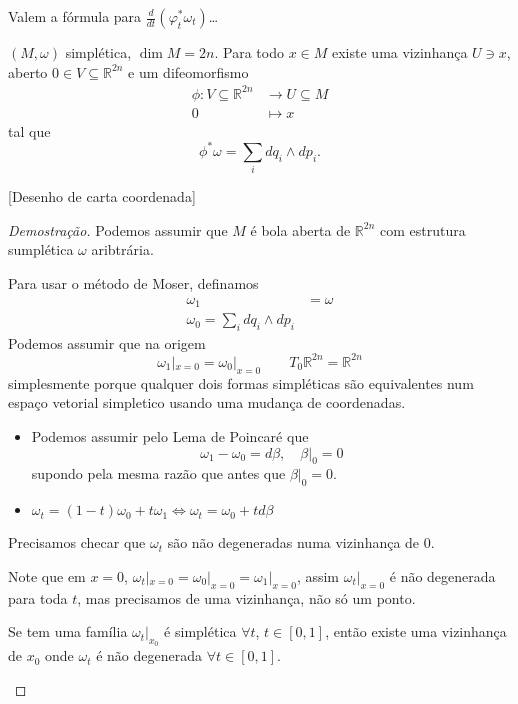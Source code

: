 Valem a f\'ormula para $\frac{d}{dt}(\varphi_t^*\omega_t)$…

\begin{thm}[Darboux]\leavevmode
	$(M,\omega)$ simpl\'etica, $\dim M=2n$. Para todo $x\in M$ existe uma vizinhança $U\ni x$, aberto  $0\in V\subseteq \mathbb{R}^{2n}$ e um difeomorfismo
	\begin{align*}
		\phi: V\subseteq \mathbb{R}^{2n} &\longrightarrow U\subseteq M \\
		0 &\longmapsto x
	\end{align*}
	tal que 
	\[\phi^* \omega=\sum_{i}dq_i\wedge dp_i.\]

	[Desenho de carta coordenada]
\end{thm}

\begin{proof}[Demostra\c c\~ao]
	Podemos assumir que $M$ \'e bola aberta de $\mathbb{R}^{2n}$ com estrutura sumpl\'etica $\omega$ aribtr\'aria.

	Para usar o m\'etodo de Moser, definamos
	\begin{align*}
		\omega_1& =\omega\\
		\omega_0=\sum_{i}dq_i\wedge dp_i
	\end{align*}
	Podemos assumir que na origem
	\[\omega_1|_{x=0}=\omega_0|_{x=0}\qquad T_0\mathbb{R}^{2n}=\mathbb{R}^{2n}\]
	simplesmente porque qualquer dois formas simpl\'eticas s\~ao equivalentes num espaço vetorial simpletico usando uma mudança de coordenadas.

\begin{itemize}
	\item	Podemos assumir pelo Lema de Poincar\'e que
	\[\omega_1-\omega_0=d\beta,\quad \beta|_{0}=0\]
supondo pela mesma raz\~ao que antes que $\beta|_{0}=0$.
	\item $\omega_t=(1-t)\omega_0+t\omega_1\iff \omega_t=\omega_0+td\beta$ 
\end{itemize}
Precisamos checar que $\omega_t$ s\~ao n\~ao degeneradas numa vizinhança de 0. 

Note que em $x=0$, $\omega_t|_{x=0}=\omega_0|_{x=0}=\omega_1|_{x=0}$, assim $\omega_t |_{x=0}$ \'e n\~ao degenerada para toda $t$, mas precisamos de uma vizinhança, n\~ao s\'o um ponto.

\begin{lemma}
	Se tem uma fam\'ilia $\omega_t|_{x_0}$ \'e simpl\'etica $\forall t$, $t\in [0,1]$, ent\~ao existe uma vizinhança de $x_0$ onde $\omega_t$ \'e n\~ao degenerada $\forall t\in[0,1]$.
\end{lemma}


\end{proof}
